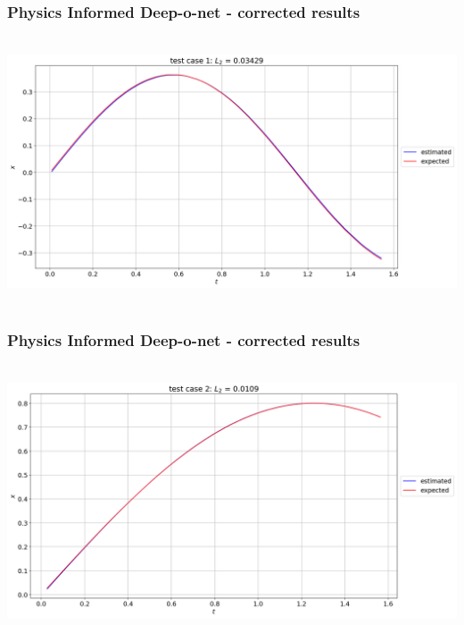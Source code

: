 \begin{frame}
    \frametitle{Physics Informed Deep-o-net - corrected results}
    \hbox{\hspace{-1cm}
        \includegraphics[scale=0.32]{supportingFiles/PI_DON_results/02_correctedOutput/test_case_1_corrected.png}\hspace{5cm}
    }
\end{frame}

\begin{frame}
    \frametitle{Physics Informed Deep-o-net - corrected results}
    \hbox{\hspace{-1cm}
        \includegraphics[scale=0.32]{supportingFiles/PI_DON_results/02_correctedOutput/test_case_2_corrected.png}\hspace{5cm}
    }
\end{frame}

